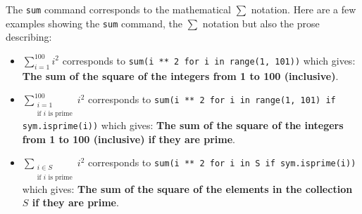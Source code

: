 The \texttt{sum} command corresponds to the mathematical
\(\sum\) notation. Here are a few examples showing the \texttt{sum} command,
the \(\sum\) notation but also the prose describing:

\begin{itemize}
\item $\sum_{i=1}^{100}i ^2$
corresponds to
\texttt{sum(i ** 2 for i in range(1, 101))}
which gives:
\textbf{The sum of the square of the integers from 1 to 100 (inclusive)}.
\item
$\sum_{\begin{array}{c}i=1\\\text{if }i\text{ is prime}\end{array}}^{100}i ^2$
corresponds to
\texttt{sum(i ** 2 for i in range(1, 101) if sym.isprime(i))}
which gives:
\textbf{The sum of the square of the integers from 1 to 100 (inclusive) if they
are prime}.
\item 
$\sum_{\begin{array}{c}i\in{S}\\\text{if }i\text{ is prime}\end{array}}i ^2$
corresponds to
\texttt{sum(i ** 2 for i in S if sym.isprime(i))}
which gives:
\textbf{The sum of the square of the elements in the collection $S$ if they are
prime}.
\end{itemize}
